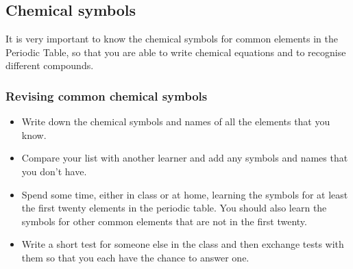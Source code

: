             \subsection{ Chemical symbols}
            \nopagebreak
      \label{m38721*id62746}It is very important to know the chemical symbols for common elements in the Periodic Table, so that you are able to write chemical equations and to recognise different compounds.\par 
\label{m38721*secfhsst!!!underscore!!!id109}
            \subsubsection{  Revising common chemical symbols
      }
            \nopagebreak
      \label{m38721*id62763}\begin{itemize}[noitemsep]
            \label{m38721*uid5}\item Write down the chemical symbols and names of all the elements that you know.
\label{m38721*uid6}\item Compare your list with another learner and add any symbols and names that you don't have.
\label{m38721*uid7}\item Spend some time, either in class or at home, learning the symbols for at least the first twenty elements in the periodic table. You should also learn the symbols for other common elements that are not in the first twenty.
\label{m38721*uid8}\item Write a short test for someone else in the class and then exchange tests with them so that you each have the chance to answer one.
\end{itemize}
    \label{m38721*cid3}
